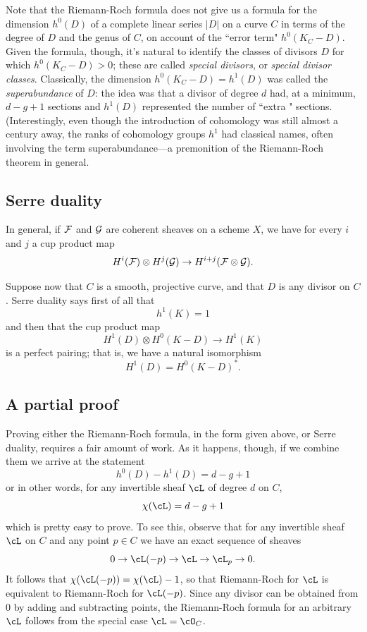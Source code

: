 Note that the Riemann-Roch formula does not give us a formula for the dimension $h^0(D)$ of a complete linear series $|D|$ on a curve $C$ in terms of the degree of $D$ and the genus of $C$, on account of the ``error term" $h^0(K_C - D)$. Given the formula, though, it's natural to identify the classes of divisors $D$ for which $h^0(K_C - D)>0$; these are called \emph{special divisors}, or \emph{special divisor classes}. Classically, the dimension $h^0(K_C-D) = h^1(D)$ was called the \emph{superabundance} of $D$: the idea was that a divisor of degree $d$ had, at a minimum, $d-g+1$ sections and $h^1(D)$ represented the number of ``extra " sections. (Interestingly, even though the introduction of cohomology was still almost a century away, the ranks of cohomology groups $h^1$ had classical names, often involving the term superabundance---a premonition of the Riemann-Roch theorem in general.

\subsection{Serre duality}

In general, if $\cF$ and $\cG$ are coherent sheaves on a scheme $X$, we have for every $i$ and $j$ a cup product map
$$
H^i(\cF) \otimes H^j(\cG) \to H^{i+j}(\cF \otimes \cG).
$$

Suppose now that $C$ is a smooth, projective curve, and that $D$ is any divisor on $C$. Serre duality says first of all that
$$
h^1(K) = 1
$$
and then that the cup product map
$$
H^1(D) \otimes H^0(K-D) \to H^1(K)
$$
is a perfect pairing; that is, we have a natural isomorphism
$$
H^1(D) = H^0(K-D)^*.
$$

\subsection{A partial proof}

Proving either the Riemann-Roch formula, in the form given above, or Serre duality, requires a fair amount of work. As it happens, though, if we combine them we arrive at the statement
$$
h^0(D) - h^1(D) = d-g+1
$$
or in other words, for any invertible sheaf $\cL$ of degree $d$ on $C$,
$$
\chi(\cL) = d-g+1
$$
which is pretty easy to prove. To see this, observe that for any invertible sheaf $\cL$ on $C$ and any point $p \in C$ we have an exact sequence of sheaves
$$
0 \to \cL(-p) \to \cL \to \cL_p \to 0.
$$
It follows that $\chi(\cL(-p)) = \chi(\cL) - 1$, so that Riemann-Roch for $\cL$ is equivalent to Riemann-Roch for $\cL(-p)$. Since any divisor can be obtained from 0 by adding and subtracting points, the Riemann-Roch formula for an arbitrary $\cL$ follows from the special case $\cL = \cO_C$.


